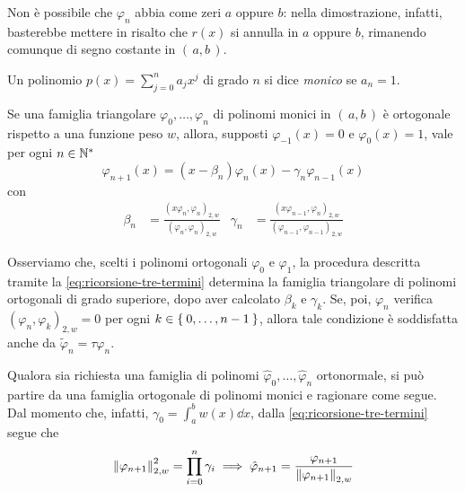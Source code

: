 	Non è possibile che \(\varphi_n\) abbia come zeri \(a\) oppure \(b\): nella dimostrazione, infatti, basterebbe mettere in risalto che \(r (x)\) si annulla in \(a\) oppure \(b\), rimanendo comunque di segno costante in \((\, a, b \,)\).
	
	\begin{definizione}
		Un polinomio \(p (x) = \sum_{j = 0}^n a_j x^j\) di grado \(n\) si dice \emph{monico} se \(a_n = 1\).
	\end{definizione}

	\begin{teorema}
		Se una famiglia triangolare \(\varphi_0, \dots, \varphi_n\) di polinomi monici in \((\, a, b \,)\) è ortogonale rispetto a una funzione peso \(w\), allora, supposti \(\varphi_{-1} (x) = 0\) e \(\varphi_0 (x) = 1\), vale per ogni \(n \in \mathbb{N}^*\)
		\begin{equation}\label{eq:ricorsione-tre-termini}
			\varphi_{n + 1} (x) = (x - \beta_n) \varphi_n (x) - \gamma_n \varphi_{n - 1} (x)
		\end{equation} 
		con
		\begin{align}
			\beta_n &= \frac{(x \varphi_n, \varphi_n)_{2, w}}{(\varphi_n, \varphi_n)_{2, w}} &
			\gamma_n &= \frac{(x \varphi_{n - 1}, \varphi_n)_{2, w}}{(\varphi_{n - 1}, \varphi_{n - 1})_{2, w}}
		\end{align}
	\end{teorema}

	Osserviamo che, scelti i polinomi ortogonali \(\varphi_0\) e \(\varphi_1\), la procedura descritta tramite la \eqref{eq:ricorsione-tre-termini} determina la famiglia triangolare di polinomi ortogonali di grado superiore, dopo aver calcolato \(\beta_k\) e \(\gamma_k\). Se, poi, \(\varphi_n\) verifica \((\varphi_n, \varphi_k)_{2, w} = 0\) per ogni \(k \in \Set{0, \dots, n - 1}\), allora tale condizione è soddisfatta anche da \(\tilde{\varphi}_n = \tau \varphi_n\).
	
	Qualora sia richiesta una famiglia di polinomi \(\hat{\varphi}_0, \dots, \hat{\varphi}_n\) ortonormale, si può partire da una famiglia ortogonale di polinomi monici e ragionare come segue. Dal momento che, infatti, \(\gamma_0 = \int_a^b w (x) \dd{x}\), dalla \eqref{eq:ricorsione-tre-termini} segue che
	\begin{equation*}
		\norm{\varphi_{n + 1}}_{2, w}^2 = \prod_{i = 0}^n \gamma_i \implies \hat{\varphi}_{n + 1} = \frac{\varphi_{n + 1}}{\norm{\varphi_{n + 1}}_{2, w}}
	\end{equation*}